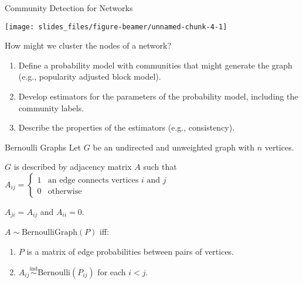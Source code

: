 \documentclass[
  ignorenonframetext,
]{beamer}
\providecommand{\tightlist}{%
  \setlength{\itemsep}{0pt}\setlength{\parskip}{0pt}}
\begin{document}
\begin{frame}{Community Detection for Networks}
\protect\hypertarget{community-detection-for-networks}{}
\newcommand{\diag}{\text{diag}}
\newcommand{\tr}{\text{Tr}}
\newcommand{\blockdiag}{\text{blockdiag}}
\newcommand{\indep}{\stackrel{\text{ind}}{\sim}}
\newcommand{\iid}{\stackrel{\text{iid}}{\sim}}
\newcommand{\Bernoulli}{\text{Bernoulli}}
\newcommand{\Betadist}{\text{Beta}}
\newcommand{\BG}{\text{BernoulliGraph}}
\newcommand{\Cat}{\text{Categorical}}
\newcommand{\Uniform}{\text{Uniform}}
\newcommand{\RDPG}{\text{RDPG}}
\newcommand{\GRDPG}{\text{GRDPG}}
\newcommand{\PABM}{\text{PABM}}

\begin{center}\texttt{[image: slides\_files/figure-beamer/unnamed-chunk-4-1]} \end{center}

How might we cluster the nodes of a network?

\begin{enumerate}
\tightlist
\item
  Define a probability model with communities that might generate the
  graph (e.g., popularity adjusted block model).
\item
  Develop estimators for the parameters of the probability model,
  including the community labels.
\item
  Describe the properties of the estimators (e.g., consistency).
\end{enumerate}
\end{frame}

\begin{frame}{Bernoulli Graphs}
\protect\hypertarget{bernoulli-graphs}{}
Let \(G\) be an undirected and unweighted graph with \(n\) vertices.

\(G\) is described by adjacency matrix \(A\) such that
\(A_{ij} = \begin{cases} 1 & \text{an edge connects vertices } i \text{ and } j \\ 0 & \text{otherwise} \end{cases}\)

\(A_{ji} = A_{ij}\) and \(A_{ii} = 0\).

\vspace*{1\baselineskip}

\(A \sim \text{BernoulliGraph}(P)\) iff:

\begin{enumerate}
\tightlist
\item
  \(P\) is a matrix of edge probabilities between pairs of vertices.
\item
  \(A_{ij} \stackrel{\text{ind}}{\sim}\text{Bernoulli}(P_{ij})\) for
  each \(i < j\).
\end{enumerate}
\end{frame}
\end{document}
